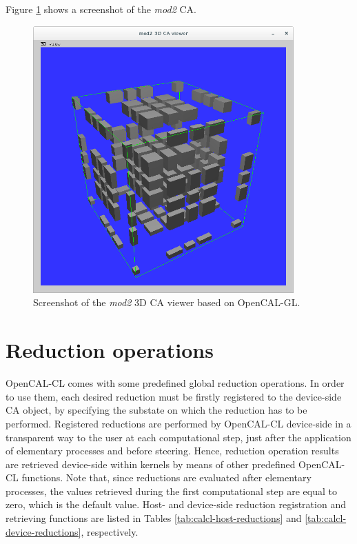 Figure \ref{fig:calgl_mod2} shows a screenshot of the \emph{mod2} CA.

\begin{figure}
  \begin{center}
    \includegraphics[width=10cm]{./images/OpenCAL/calgl_mod2}
    \caption{Screenshot of the \emph{mod2} 3D CA viewer based on
      OpenCAL-GL.}
    \label{fig:calgl_mod2}
  \end{center}
\end{figure}




\section{Reduction operations}
OpenCAL-CL comes with some predefined global reduction operations. In
order to use them, each desired reduction must be firstly registered
to the device-side CA object, by specifying the substate on which the
reduction has to be performed. Registered reductions are performed by
OpenCAL-CL device-side in a transparent way to the user at each
computational step, just after the application of elementary processes
and before steering. Hence, reduction operation results are retrieved
device-side within kernels by means of other predefined OpenCAL-CL
functions. Note that, since reductions are evaluated after elementary
processes, the values retrieved during the first computational step
are equal to zero, which is the default value. Host- and device-side
reduction registration and retrieving functions are listed in Tables
\ref{tab:calcl-host-reductions} and \ref{tab:calcl-device-reductions},
respectively.


